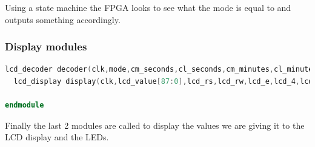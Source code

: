 \documentclass[12pt,a4paper,hidelinks]{article}            %
\begin{document}
Using a state machine the FPGA looks to see what the mode is equal to and outputs something accordingly.

\subsubsection{Display modules}

\begin{lstlisting}[language=Verilog,firstnumber=638]
  lcd_decoder decoder(clk,mode,cm_seconds,cl_seconds,cm_minutes,cl_minutes,cm_hours,cl_hours,cm_days,cl_days,cm_months,cl_months,lcd_value[87:0]);
  lcd_display display(clk,lcd_value[87:0],lcd_rs,lcd_rw,lcd_e,lcd_4,lcd_5,lcd_6,lcd_7);

endmodule
\end{lstlisting}

Finally the last 2 modules are called to display the values we are giving it to the LCD display and the LEDs.
\end{document}
